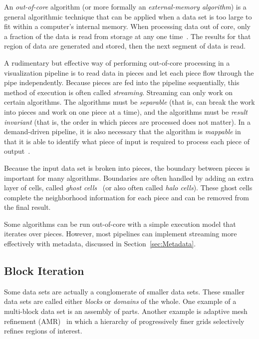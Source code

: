 \documentclass[journal,twocolumn,10pt,letterpaper,twoside]{IEEEtran}
\newcommand*{\lcite}[1]{~\cite{#1}}
\newcommand*{\keyterm}[1]{\emph{#1}}
\begin{document}
An \keyterm{out-of-core} algorithm (or more formally an
\keyterm{external-memory algorithm}) is a general algorithmic technique
that can be applied when a data set is too large to fit within a computer's
internal memory.  When processing data out of core, only a fraction of the
data is read from storage at any one time\lcite{Vitter2001}.  The results
for that region of data are generated and stored, then the next segment of
data is read.

A rudimentary but effective way of performing out-of-core processing in a
visualization pipeline is to read data in pieces and let each piece flow
through the pipe independently.  Because pieces are fed into the pipeline
sequentially, this method of execution is often called \keyterm{streaming}.
Streaming can only work on certain algorithms.  The algorithms must be
\keyterm{separable} (that is, can break the work into pieces and work on
one piece at a time), and the algorithms must be \keyterm{result invariant}
(that is, the order in which pieces are processed does not matter).  In a
demand-driven pipeline, it is also necessary that the algorithm is
\keyterm{mappable} in that it is able to identify what piece of input is
required to process each piece of output\lcite{Law1999}.

Because the input data set is broken into pieces, the boundary between
pieces is important for many algorithms.  Boundaries are often handled by
adding an extra layer of cells, called \keyterm{ghost
  cells}\lcite{Ahrens2001} (or also often called \keyterm{halo cells}).
These ghost cells complete the neighborhood information for each piece and
can be removed from the final result.

Some algorithms can be run out-of-core with a simple execution model that
iterates over pieces.  However, most pipelines can implement streaming more
effectively with metadata, discussed in Section~\ref{sec:Metadata}.

\subsection{Block Iteration}
\label{sec:BlockIteration}

Some data sets are actually a conglomerate of smaller data sets.  These
smaller data sets are called either \keyterm{blocks} or \keyterm{domains}
of the whole.  One example of a multi-block data set is an assembly of
parts.  Another example is adaptive mesh refinement (AMR)\lcite{Berger1989}
in which a hierarchy of progressively finer grids selectively refines
regions of interest.
\end{document}
